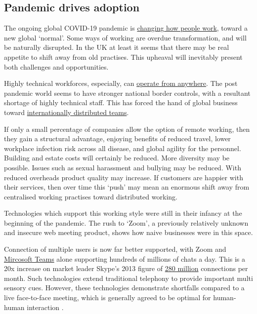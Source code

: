 \subsection{Pandemic drives adoption}
The ongoing global COVID-19 pandemic is \href{https://blog.yelp.com/news/the-future-of-work-is-remote/}{changing how people work}, toward a new global `normal'. Some ways of working are overdue transformation, and will be naturally disrupted. In the UK at least it seems that there may be real appetite to shift away from old practises. This upheaval will inevitably present both challenges and opportunities.\par
Highly technical workforces, especially, can \href{https://globalworkplaceanalytics.com/telecommuting-statistics}{operate from anywhere}. The post pandemic world seems to have stronger national border controls, with a resultant shortage of highly technical staff. This has forced the hand of global business toward \href{https://www.lifeatspotify.com/being-here/work-from-anywhere}{internationally distributed teams}. \par
If only a small percentage of companies allow the option of remote working, then they gain a structural advantage, enjoying benefits of reduced travel, lower workplace infection risk across all disease, and global agility for the personnel. Building and estate costs will certainly be reduced. More diversity may be possible. Issues such as sexual harassment and bullying may be reduced.  With reduced overheads product quality may increase. If customers are happier with their services, then over time this `push' may mean an enormous shift away from centralised working practises toward distributed working. \par
Technologies which support this working style were still in their infancy at the beginning of the pandemic. The rush to `Zoom', a previously relatively unknown and insecure \cite{aiken2020zooming} web meeting product, shows how naive businesses were in this space. \par
Connection of multiple users is now far better supported, with Zoom and \href{https://www.microsoft.com/en-us/Investor/earnings/FY-2021-Q1/press-release-webcast}{Mircosoft Teams} alone supporting hundreds of millions of chats a day. This is a 20x increase on market leader Skype's 2013 figure of \href{https://www.microsoft.com/en-us/Investor/earnings/FY-2013-Q1/press-release-webcast}{280 million} connections per month. Such technologies extend traditional telephony to provide important multi sensory cues.  However, these technologies demonstrate shortfalls compared to a live face-to-face meeting, which is generally agreed to be optimal for human-human interaction \cite{Wolff2008}.\par
